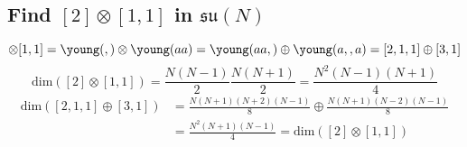 \documentclass[main.tex]{subfiles}
\begin{document}
\subsection{Find $[2]\otimes[1,1]$ in $\mathfrak{su}(N)$}

\begin{equation}
[2]\otimes[1,1]=\young(\hfil,\hfil)\otimes\young(aa)=\young(\hfil aa,\hfil)\oplus\young(\hfil a,\hfil,a)=[2,1,1]\oplus[3,1]
\end{equation}
\begin{equation}
\text{dim}([2]\otimes[1,1])=\frac{N(N-1)}{2}\frac{N(N+1)}{2}=\frac{N^2(N-1)(N+1)}{4}
\end{equation}
\begin{align}
\text{dim}([2,1,1]\oplus[3,1])&=\frac{N(N+1)(N+2)(N-1)}{8}\oplus\frac{N(N+1)(N-2)(N-1)}{8}\\&
=\frac{N^2(N+1)(N-1)}{4}=\text{dim}([2]\otimes[1,1])
\end{align}
\end{document}
